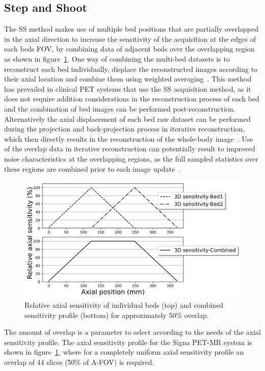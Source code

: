 \subsection{Step and Shoot}
The SS method makes use of multiple bed positions that are partially overlapped in the axial direction to increase the sensitivity of the acquisition at the edges of each beds FOV, by combining data of adjacent beds over the overlapping region as shown in figure~\ref{fig3_1:fullOverlap}. One way of combining the multi-bed datasets is to reconstruct each bed individually, displace the reconstructed images according to their axial location and combine them using weighted averaging~\cite{Schubert1996}. This method has prevailed in clinical PET systems that use the SS acquisition method, as it does not require addition considerations in the reconstruction process of each bed and the combination of bed images can be performed post-reconstruction. Alternatively the axial displacement of each bed raw dataset can be performed during the projection and back-projection process in iterative reconstruction, which then directly results in the reconstruction of the whole-body image~\cite{Ross2004}. Use of the overlap data in iterative reconstruction can potentially result to improved noise characteristics at the overlapping regions, as the full sampled statistics over these regions are combined prior to each image update~\cite{Ross2004,Stute2014}. 
%
\begin{figure} [ht!]
\centering
\includegraphics[scale=0.5,angle=0]{3_Results/3_1_DWB_Optimization/figures/SensitivityProfiles_fullOverlap.png}
\caption{Relative axial sensitivity of individual beds (top) and combined sensitivity profile (bottom) for approximately 50\% overlap.} 
\label{fig3_1:fullOverlap}
\end{figure}
%
The amount of overlap is a parameter to select according to the needs of the axial sensitivity profile.  The axial sensitivity profile for the Signa PET-MR system is shown in figure~\ref{fig3_1:fullOverlap}, where for a completely uniform axial sensitivity profile an overlap of 44 slices (\~50\% of A-FOV) is required.
